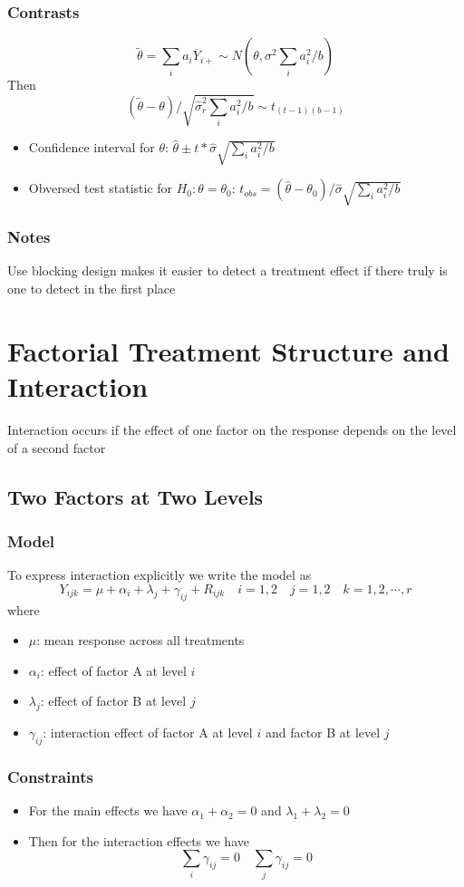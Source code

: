 \documentclass[11pt]{article}
\begin{document}
\subsubsection{Contrasts}
\[\tilde{\theta}=\sum_i a_i\overline{Y}_{i+}\sim N(\theta, \sigma^2\sum_i a_i^2/b)\]
Then 
\[(\tilde{\theta}-\theta)/\sqrt{\hat\sigma_r^2\sum_i a_i^2/b}\sim t_{(t-1)(b-1)}\]    
\begin{itemize}
    \item Confidence interval for $\theta$: $\hat\theta\pm t*\hat\sigma\sqrt{\sum_i a_i^2/b}$
    \item Obversed test statistic for $H_0:\theta=\theta_0$: $t_{obs}=(\hat\theta-\theta_0)/\hat\sigma\sqrt{\sum_i a_i^2/b}$
\end{itemize}
\subsubsection{Notes}
Use blocking design makes it easier to detect a treatment effect if there truly is one to detect in the first place

\section{Factorial Treatment Structure and Interaction}
Interaction occurs if the effect of one factor on the response depends on the level of a second factor 
\subsection{Two Factors at Two Levels}
\subsubsection{Model}
To express interaction explicitly we write the model as 
\[Y_{ijk}=\mu+\alpha_i+\lambda_j+\gamma_{ij}+R_{ijk}\quad i=1,2\quad j=1,2\quad k=1,2,\cdots,r\]
where
\begin{itemize}
    \item $\mu$: mean response across all treatments 
    \item $\alpha_i$: effect of factor A at level $i$
    \item $\lambda_j$: effect of factor B at level $j$
    \item $\gamma_{ij}$: interaction effect of factor A at level $i$ and factor B at level $j$
\end{itemize}
\subsubsection*{Constraints}
\begin{itemize}
    \item For the main effects we have $\alpha_1+\alpha_2=0$ and $\lambda_1+\lambda_2=0$
    \item Then for the interaction effects we have 
    \[\sum_i\gamma_{ij}=0\quad \sum_j\gamma_{ij}=0\]
\end{itemize}
\end{document}
